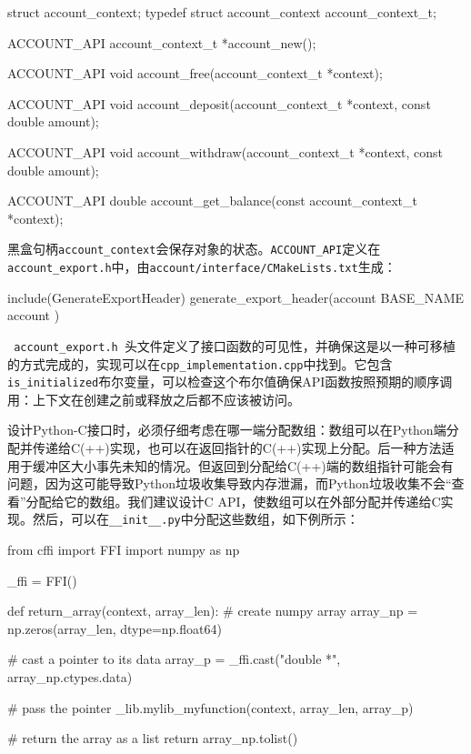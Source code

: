 \begin{codebox}[cpp]
struct account_context;
typedef struct account_context account_context_t;

ACCOUNT_API
account_context_t *account_new();

ACCOUNT_API
void account_free(account_context_t *context);

ACCOUNT_API
void account_deposit(account_context_t *context, const double amount);

ACCOUNT_API
void account_withdraw(account_context_t *context, const double amount);

ACCOUNT_API
double account_get_balance(const account_context_t *context);
\end{codebox}

黑盒句柄\texttt{account\_context}会保存对象的状态。\texttt{ACCOUNT\_API}定义在\texttt{account\_export.h}中，由\texttt{account/interface/CMakeLists.txt}生成：

\begin{codebox}[cmake]
include(GenerateExportHeader)
generate_export_header(account
  BASE_NAME account
  )
\end{codebox}

\texttt{ account\_export.h }头文件定义了接口函数的可见性，并确保这是以一种可移植的方式完成的，实现可以在\texttt{cpp\_implementation.cpp}中找到。它包含\texttt{is\_initialized}布尔变量，可以检查这个布尔值确保API函数按照预期的顺序调用：上下文在创建之前或释放之后都不应该被访问。


设计Python-C接口时，必须仔细考虑在哪一端分配数组：数组可以在Python端分配并传递给C(++)实现，也可以在返回指针的C(++)实现上分配。后一种方法适用于缓冲区大小事先未知的情况。但返回到分配给C(++)端的数组指针可能会有问题，因为这可能导致Python垃圾收集导致内存泄漏，而Python垃圾收集不会“查看”分配给它的数组。我们建议设计C API，使数组可以在外部分配并传递给C实现。然后，可以在\texttt{\_\_init\_\_.py}中分配这些数组，如下例所示：

\begin{codebox}[python]
from cffi import FFI
import numpy as np

_ffi = FFI()

def return_array(context, array_len):
  # create numpy array
  array_np = np.zeros(array_len, dtype=np.float64)

  # cast a pointer to its data
  array_p = _ffi.cast("double *", array_np.ctypes.data)

  # pass the pointer
  _lib.mylib_myfunction(context, array_len, array_p)

  # return the array as a list
  return array_np.tolist()
\end{codebox}

